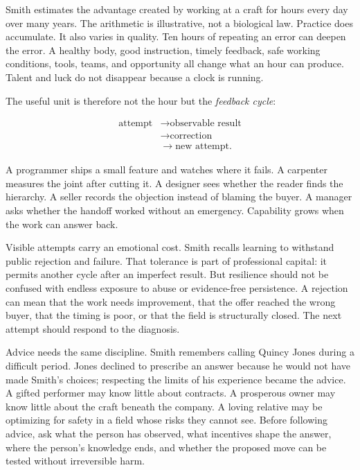 Smith estimates the advantage created by working at a craft for hours every
day over many years. The arithmetic is illustrative, not a biological law.
Practice does accumulate. It also varies in quality. Ten hours of repeating an
error can deepen the error. A healthy body, good instruction, timely feedback,
safe working conditions, tools, teams, and opportunity all change what an hour
can produce. Talent and luck do not disappear because a clock is running.

The useful unit is therefore not the hour but the \emph{feedback cycle}:

\begin{equation}
\begin{aligned}
\text{attempt}&\longrightarrow \text{observable result}\\
&\longrightarrow \text{correction}\\
&\longrightarrow \text{new attempt}.
\end{aligned}
\end{equation}

A programmer ships a small feature and watches where it fails. A carpenter
measures the joint after cutting it. A designer sees whether the reader finds
the hierarchy. A seller records the objection instead of blaming the buyer. A
manager asks whether the handoff worked without an emergency. Capability grows
when the work can answer back.

Visible attempts carry an emotional cost. Smith recalls learning to withstand
public rejection and failure. That tolerance is part of professional capital:
it permits another cycle after an imperfect result. But resilience should not
be confused with endless exposure to abuse or evidence-free persistence. A
rejection can mean that the work needs improvement, that the offer reached the
wrong buyer, that the timing is poor, or that the field is structurally closed.
The next attempt should respond to the diagnosis.

Advice needs the same discipline. Smith remembers calling Quincy Jones during
a difficult period. Jones declined to prescribe an answer because he would not
have made Smith's choices; respecting the limits of his experience became the
advice. A gifted performer may know little about contracts. A prosperous owner
may know little about the craft beneath the company. A loving relative may be
optimizing for safety in a field whose risks they cannot see. Before following
advice, ask what the person has observed, what incentives shape the answer,
where the person's knowledge ends, and whether the proposed move can be tested
without irreversible harm.


